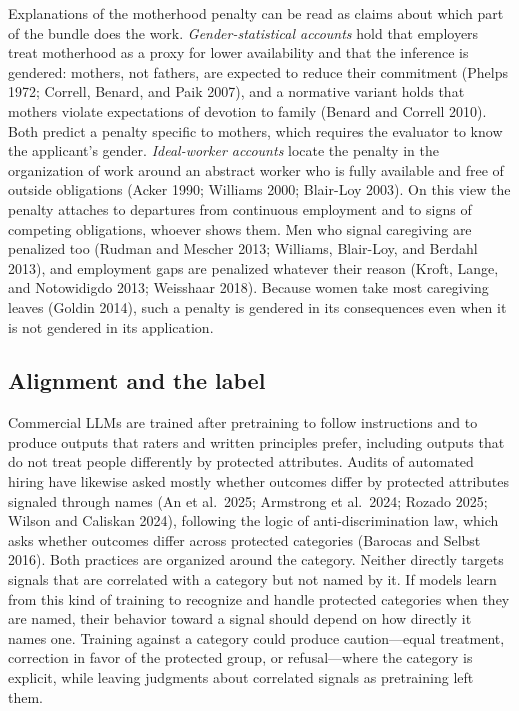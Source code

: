 \documentclass[11pt]{article}
\begin{document}
Explanations of the motherhood penalty can be read as claims about which
part of the bundle does the work. \emph{Gender-statistical accounts}
hold that employers treat motherhood as a proxy for lower availability
and that the inference is gendered: mothers, not fathers, are expected
to reduce their commitment (Phelps 1972; Correll, Benard, and Paik
2007), and a normative variant holds that mothers violate expectations
of devotion to family (Benard and Correll 2010). Both predict a penalty
specific to mothers, which requires the evaluator to know the
applicant's gender. \emph{Ideal-worker accounts} locate the penalty in
the organization of work around an abstract worker who is fully
available and free of outside obligations (Acker 1990; Williams 2000;
Blair-Loy 2003). On this view the penalty attaches to departures from
continuous employment and to signs of competing obligations, whoever
shows them. Men who signal caregiving are penalized too (Rudman and
Mescher 2013; Williams, Blair-Loy, and Berdahl 2013), and employment
gaps are penalized whatever their reason (Kroft, Lange, and Notowidigdo
2013; Weisshaar 2018). Because women take most caregiving leaves (Goldin
2014), such a penalty is gendered in its consequences even when it is
not gendered in its application.

\hypertarget{alignment-and-the-label}{%
\subsection{Alignment and the label}\label{alignment-and-the-label}}

Commercial LLMs are trained after pretraining to follow instructions and
to produce outputs that raters and written principles prefer, including
outputs that do not treat people differently by protected attributes.
Audits of automated hiring have likewise asked mostly whether outcomes
differ by protected attributes signaled through names (An et al.~2025;
Armstrong et al.~2024; Rozado 2025; Wilson and Caliskan 2024), following
the logic of anti-discrimination law, which asks whether outcomes differ
across protected categories (Barocas and Selbst 2016). Both practices
are organized around the category. Neither directly targets signals that
are correlated with a category but not named by it. If models learn from
this kind of training to recognize and handle protected categories when
they are named, their behavior toward a signal should depend on how
directly it names one. Training against a category could produce
caution---equal treatment, correction in favor of the protected group,
or refusal---where the category is explicit, while leaving judgments
about correlated signals as pretraining left them.
\end{document}
